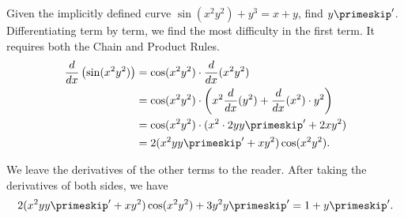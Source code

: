 \begin{example}\label{ex_implicit5}
Given the implicitly defined curve $\sin(x^2y^2)+y^3=x+y$, find $y\primeskip'$.
\solution
Differentiating term by term, we find the most difficulty in the first term.  It requires both the Chain and Product Rules.
\begin{align*}
	\frac{d}{dx}\left(\sin (x^2y^2)\right)
	&= \cos(x^2y^2) \cdot \frac{d}{dx} (x^2y^2)\\
	&= \cos(x^2y^2) \cdot \left(x^2 \frac{d}{dx} (y^2)
	+ \frac{d}{dx} (x^2) \cdot y^2\right)\\
	&= \cos(x^2y^2) \cdot (x^2 \cdot 2yy\primeskip'+2xy^2)\\
	&= 2(x^2yy\primeskip'+xy^2)\cos(x^2y^2). \\
\end{align*}

We leave the derivatives of the other terms to the reader. After taking the derivatives of both sides, we have
\[2(x^2yy\primeskip'+xy^2)\cos(x^2y^2) + 3y^2y\primeskip' = 1 + y\primeskip'.\]


\end{example}
